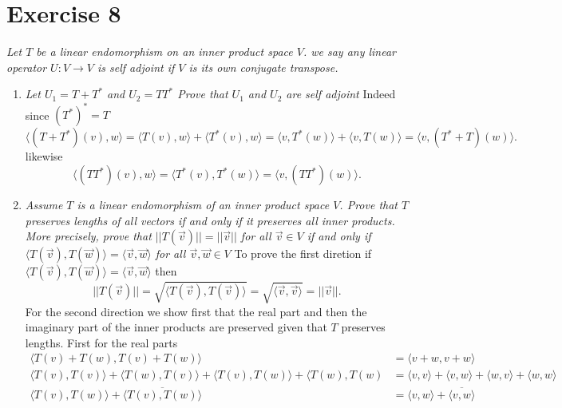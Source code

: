 \documentclass{article}
\begin{document}
     \section{Exercise 8}
     \emph{
         Let $T$ be a linear endomorphism on an inner product space $V$. we say any linear operator
         $U : V \rightarrow V$ is self adjoint if $V$ is its own conjugate transpose.
     }
     \begin{enumerate}
         \item \emph{
                 Let $U_1 = T + T^{*} $ and $U_2 = TT^{*}$ Prove that $U_1$ and $U_2$ are self adjoint
             }
             Indeed since $(T^{*})^{*} = T$
             \[
             \langle (T+T^{*})(v) , w \rangle = \langle T(v) , w \rangle + \langle T^{*}(v), w \rangle
             = \langle v, T^{*}(w) \rangle + \langle v, T(w) \rangle = \langle v, (T^{*} + T)(w) \rangle
             .\] 
             likewise
             \[
             \langle (TT^{*})(v) , w \rangle = \langle T^{*}(v), T^{*}(w) \rangle = \langle v , (TT^{*})(w) \rangle
             .\] 
         \item \emph{
                 Assume $T$ is a linear endomorphism of an inner product space $V$. Prove that
                 $T$ preserves lengths of all vectors if and only if it preserves all inner products.
                 More precisely, prove that $||T(\vec{v})|| = ||\vec{v}||$ for all $\vec{v} \in V$ if and only
                 if $\langle T(\vec{v}), T(\vec{w}) \rangle = \langle \vec{v}, \vec{w} \rangle$ for all $ \vec{v}, \vec{w} \in V$
             }
             To prove the first diretion if $ \langle T(\vec{v}) , T(\vec{w}) \rangle = \langle \vec{v}, \vec{w} \rangle$ then 
             \[
                 ||T(\vec{v})|| = \sqrt{\langle T(\vec{v}) , T(\vec{v}) \rangle} = \sqrt{\langle \vec{v}, \vec{v} \rangle} = ||\vec{v}||
             .\] 
             For the second direction we show first that the real part and then the imaginary part of the inner products are preserved
             given that $T$ preserves lengths. First for the real parts
             \begin{align*}
                 \langle T(v) + T(w), T(v) + T(w) \rangle &= \langle v + w, v + w \rangle\\
                 \langle T(v), T(v) \rangle + \langle T(w), T(v) \rangle + \langle T(v), T(w) \rangle + \langle T(w), T(w) &= \langle v, v \rangle + \langle v, w \rangle + \langle w, v \rangle + \langle w, w \rangle\\
                 \langle T(v), T(w) \rangle + \overline{ \langle T(v), T(w) \rangle} &= \langle v, w \rangle + \overline{\langle v, w \rangle}

\end{align*}
\end{enumerate}
\end{document}
